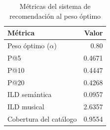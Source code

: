 \begin{table}[htbp]
  \centering
  \caption{Métricas del sistema de recomendación al peso óptimo}
  \label{tab:recommendation_optimal_metrics}
  \begin{tabular}{lr}
    \toprule
    Métrica & Valor \\
    \midrule
    Peso óptimo ($\alpha$) & 0.80 \\
    P@5 & 0.4671 \\
    P@10 & 0.4447 \\
    P@20 & 0.4268 \\
    \midrule
    ILD semántica & 0.0957 \\
    ILD musical & 2.6357 \\
    \midrule
    Cobertura del catálogo & 0.9554 \\
    \bottomrule
  \end{tabular}
\end{table}